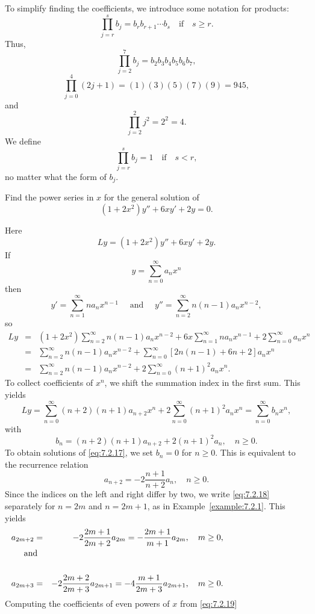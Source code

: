 \documentclass{ximera}
\begin{document}
To simplify
finding the coefficients, we introduce some notation for
products:
$$
\prod^s_{j=r}b_j=b_rb_{r+1}\cdots b_s\quad \mbox{if}
\quad s\geq r.
$$
Thus,
$$
\prod^7_{j=2}b_j=b_2b_3b_4b_5b_6b_7,
$$
$$
\prod^4_{j=0}(2j+1)=(1)(3)(5)(7)(9)=945,
$$
and
$$
\prod^2_{j=2}j^2=2^2=4.
$$
We define
$$
\prod^s_{j=r}b_j=1\quad \mbox{if}\quad s < r,
$$
no matter what the form of $b_j$.

\begin{example}\label{example:7.2.2}
Find the power series in $x$ for the general solution of
\begin{equation}\label{eq:7.2.17}
 (1+2x^2)y''+6xy'+2y=0.
\end{equation}
\begin{explanation}
Here
$$
Ly=(1+2x^2)y''+6xy'+2y.
$$
If
$$
y=\sum_{n=0}^\infty a_nx^n
$$
then
$$
y'=\sum_{n=1}^\infty na_nx^{n-1}\quad\mbox{ and }\quad
y''=\sum_{n=2}^\infty n(n-1)a_nx^{n-2},
$$
so
\begin{eqnarray*}
Ly&=&(1+2x^2) \sum^\infty_{n=2}n(n-1)a_nx^{n-2}+ 6x
 \sum^\infty_{n=1}na_nx^{n-1}
 +2 \sum^\infty_{n=0}a_nx^n\\
&=&\sum_{n=2}^\infty n(n-1)a_nx^{n-2}+\sum_{n=0}^\infty
\left[2n(n-1)+6n+2\right]a_nx^n\\
&=&\sum_{n=2}^\infty n(n-1)a_nx^{n-2}+2\sum_{n=0}^\infty(n+1)^2a_nx^n.
\end{eqnarray*}
To collect coefficients of $x^n$,  we shift the summation index
in the first sum.  This yields
$$
Ly=\sum_{n=0}^\infty(n+2)(n+1)a_{n+2}x^n+2\sum_{n=0}^\infty(n+1)^2a_nx^n
=\sum_{n=0}^\infty b_nx^n,
$$
with
$$
b_n=(n+2)(n+1)a_{n+2}+2(n+1)^2a_n,\quad n\geq0.
$$
To obtain solutions of \eqref{eq:7.2.17}, we set $b_n=0$ for $n\geq0$. This
is equivalent to the recurrence relation
 \begin{equation}\label{eq:7.2.18}
a_{n+2}=-2\frac{n+1}{n+2}a_n,\quad n\geq0.
\end{equation}
Since the
indices on the left and right differ by two, we write \eqref{eq:7.2.18}
separately for $n=2m$ and $n=2m+1$, as in Example~\ref{example:7.2.1}.
This yields
\begin{eqnarray}
a_{2m+2}&=&-2 \frac{2m+1}{2m+2}a_{2m}=-\frac{2m+1}{m+1}a_{2m},\quad m
\geq0,\label{eq:7.2.19}\\
\noalign{\mbox{and}}\nonumber\\
a_{2m+3}&=&-2\frac{2m+2}{2m+3}a_{2m+1}=-4\frac{m+1}{2m+3}a_{2m+1},\quad
m\geq0. \label{eq:7.2.20}
\end{eqnarray}
Computing the coefficients of even powers of $x$ from \eqref{eq:7.2.19}

\end{explanation}
\end{example}
\end{document}
